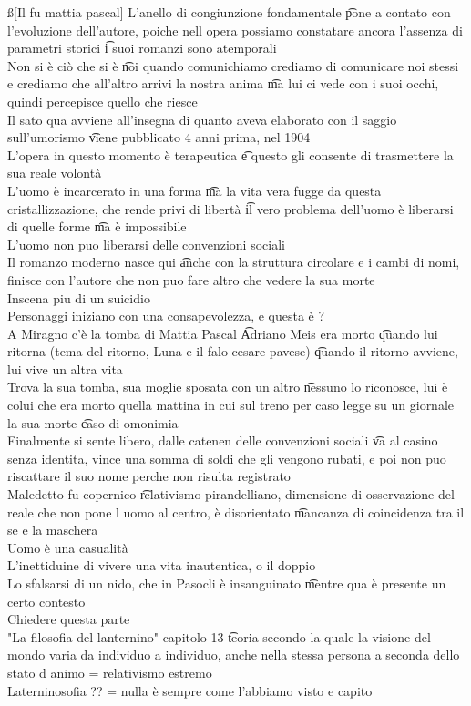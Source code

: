 \documentclass[12pt]{article}
\begin{document}
\ss[Il fu mattia pascal]
L'anello di congiunzione fondamentale \t pone a contato con l'evoluzione dell'autore, poiche nell opera possiamo constatare ancora l'assenza di parametri storici \t i suoi romanzi sono atemporali \\
Non si è ciò che si è \t noi quando comunichiamo crediamo di comunicare noi stessi e crediamo che all'altro arrivi la nostra anima \t ma lui ci vede con i suoi occhi, quindi percepisce quello che riesce \\
Il sato qua avviene all'insegna di quanto aveva elaborato con il saggio sull'umorismo \t viene pubblicato 4 anni prima, nel 1904 \\
L'opera in questo momento è terapeutica \t e questo gli consente di trasmettere la sua reale volontà \\
L'uomo è incarcerato in una forma \t ma la vita vera fugge da questa cristallizzazione, che rende privi di libertà \t il vero problema dell'uomo è liberarsi di quelle forme \t ma è impossibile \\
L'uomo non puo liberarsi delle convenzioni sociali \\
Il romanzo moderno nasce qui \t anche con la struttura circolare e i cambi di nomi, finisce con l'autore che non puo fare altro che vedere la sua morte \\
Inscena piu di un suicidio \\
Personaggi iniziano con una consapevolezza, e questa è ? \\
A Miragno c'è la tomba di Mattia Pascal \t Adriano Meis era morto \t quando lui ritorna (tema del ritorno, Luna e il falo cesare pavese) \t quando il ritorno avviene, lui vive un altra vita \\
Trova la sua tomba, sua moglie sposata con un altro \t nessuno lo riconosce, lui è colui che era morto quella mattina in cui sul treno per caso legge su un giornale la sua morte \t caso di omonimia \\
Finalmente si sente libero, dalle catenen delle convenzioni sociali \t va al casino senza identita, vince una somma di soldi che gli vengono rubati, e poi non puo riscattare il suo nome perche non risulta registrato \\
Maledetto fu copernico \t relativismo pirandelliano, dimensione di osservazione del reale che non pone l uomo al centro, è disorientato \t mancanza di coincidenza tra il se e la maschera \\
Uomo è una casualità \\
L'inettiduine di vivere una vita inautentica, o il doppio \\
Lo sfalsarsi di un nido, che in Pasocli è insanguinato \t mentre qua è presente un certo contesto \\
Chiedere questa parte \\
"La filosofia del lanternino" capitolo 13 \t teoria secondo la quale la visione del mondo varia da individuo a individuo, anche nella stessa persona a seconda dello stato d animo = relativismo estremo \\
Laterninosofia ?? = nulla è sempre come l'abbiamo visto e capito
\end{document}
